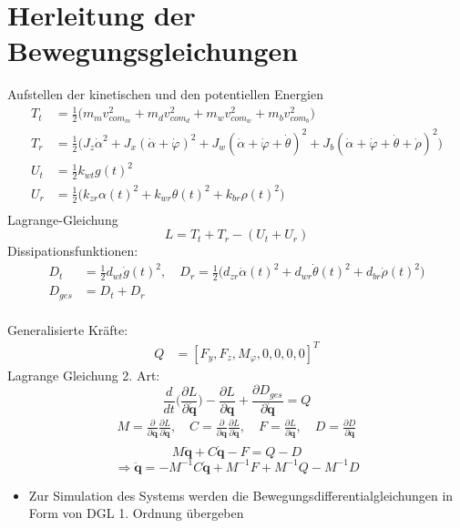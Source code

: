 \documentclass[10pt,xcolor=dvipsnames]{beamer}
\begin{document}
\section{Herleitung der Bewegungsgleichungen}
	\begin{frame}
		Aufstellen der kinetischen und den potentiellen Energien
		\begin{align*}
			T_{t}&= \frac{1}{2}\bigg(m_{m}v_{com_{m}}^{2} +m_{d}v_{com_{d}}^{2}+m_{w}v_{com_{w}}^{2}+m_{b}v_{com_{b}}^{2}\bigg)\\  
			T_{r}&= \frac{1}{2}\bigg(J_{z}\dot{\alpha}^{2}+J_{x}(\dot{\alpha}+\dot{\varphi})^{2} +J_{w}(\dot{\alpha}+\dot{\varphi}+\dot{\theta})^{2} +J_{b}(\dot{\alpha}+\dot{\varphi}+\dot{\theta}+ \dot{\rho})^{2}\bigg)\\   
			U_{t} &= \frac{1}{2}k_{wt}g(t)^{2}\\
			U_{r} &= \frac{1}{2}\bigg(k_{zr}\alpha(t)^{2}+ k_{wr}\theta(t)^{2}+k_{br}\rho(t)^2\bigg)\\
		\end{align*}
		Lagrange-Gleichung
		\begin{equation*}
			L = T_{t}+T_{r} - (U_{t}+U_{r})
		\end{equation*}
		Dissipationsfunktionen:
		\begin{align*}
		D_{t} &= \frac{1}{2}d_{wt}\dot{g}(t)^{2}, \quad
		D_{r} = \frac{1}{2}\bigg(d_{zr}\dot{\alpha}(t)^{2} + d_{wr}\dot{\theta}(t)^{2} + d_{br}\dot{\rho}(t)^{2}\bigg)\\
		D_{ges} &= D_{t} + D_{r}\\
		\end{align*}
	\end{frame}

	\begin{frame}
		Generalisierte Kräfte:
		\begin{align*}
			Q & = [F_{y}, F_{z}, M_{\varphi},0 , 0, 0, 0]^{T}
		\end{align*}
		Lagrange Gleichung 2. Art:
		\[\frac{d}{dt}\bigg(\frac{\partial L}{\partial \bm{\dot{q}}} \bigg) -\frac{\partial L}{\partial \bm{q}} + \frac{\partial D_{ges}}{\partial \bm{\dot{q}}} = Q \]
		\begin{align*}
			M = \frac{\partial}{\partial\bm{\dot{q}}}\frac{\partial L}{\partial\bm{\dot{q}}}, \quad 
			C = \frac{\partial}{\partial\bm{q}}\frac{\partial L}{\partial\bm{\dot{q}}}, \quad
			F = \frac{\partial L}{\partial\bm{q}}, \quad 
			D = \frac{\partial D}{\partial\bm{\dot{q}}} \\
		\end{align*}
		\[ M\bm{\ddot{q}} + C\bm{\dot{q}} - F = Q - D\]
		\begin{equation*}
			\Rightarrow \bm{\ddot{q}}=  - M^{-1}C\bm{\dot{q}} + M^{-1}F + M^{-1}Q - M^{-1}D
		\end{equation*}
		\begin{itemize}
			\item Zur Simulation des Systems werden die Bewegungsdifferentialgleichungen in Form von DGL 1. Ordnung übergeben 
		\end{itemize}
	\end{frame}
\end{document}
